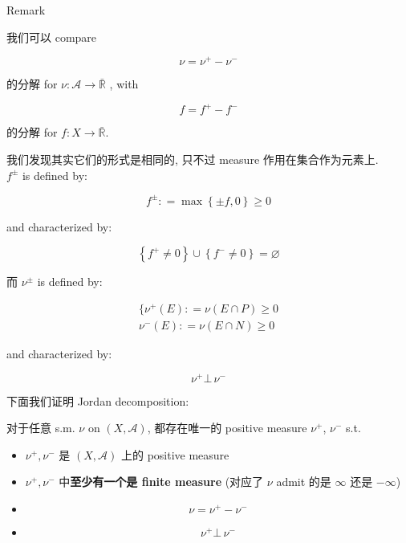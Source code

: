 \begin{qlremark}{Remark}

我们可以 compare

\[\nu = \nu^{+} - \nu^{-}\]

的分解 for \(\nu:\mathcal{A}\rightarrow\bar{\mathbb{R}}\) , with

\[f = f^{+} - f^{-}\]

的分解 for \(f:X\rightarrow\bar{\mathbb{R}}\).

我们发现其实它们的形式是相同的, 只不过 measure 作用在集合作为元素上.\\
\(f^{\pm}\) is defined by:

\[f^{\pm}: = \max\left\{ {\pm f,0} \right\} \geq 0\]

and characterized by:

\[\left\{ {f^{+} \neq 0} \right\} \cup \left\{ {f^{-} \neq 0} \right\} = \varnothing\]

而 \(\nu^{\pm}\) is defined by:

\[\begin{matrix}
{\{\nu^{+}(E): = \nu(E \cap P) \geq 0} \\
{\nu^{-}(E): = \nu(E \cap N) \geq 0}
\end{matrix}\]

and characterized by:

\[\nu^{+}\bot\,\nu^{-}\]

\end{qlremark}

下面我们证明 Jordan decomposition:

\begin{theorem}{}

对于任意 s.m. \(\nu\) on \((X,\mathcal{A})\), 都存在唯一的 positive measure \(\nu^{+}\), \(\nu^{-}\) s.t.

\begin{itemize}
\item
  \(\nu^{+},\nu^{-}\) 是 \((X,\mathcal{A})\) 上的 positive measure
\item
  \(\nu^{+},\nu^{-}\) 中\textbf{至少有一个是 finite measure} (对应了 \(\nu\) admit 的是 \(\infty\) 还是 \(- \infty\))
\item
  \[\nu = \nu^{+} - \nu^{-}\]
\item
  \[\nu^{+}\bot\,\nu^{-}\]
\end{itemize}

\end{theorem}

